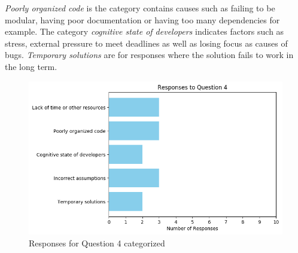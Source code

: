 \documentclass[../main.tex]{subfiles}
\begin{document}
\textit{Poorly organized code} is the category contains causes such as failing to be modular, having poor documentation or having too many dependencies for example. The category \textit{cognitive state of developers} indicates factors such as stress, external pressure to meet deadlines as well as losing focus as causes of bugs. \textit{Temporary solutions} are for responses where the solution fails to work in the long term. 

\begin{figure}[H]
    \centering
    \includegraphics[scale=0.7]{images/Results/RQ2/RQ2_question_4.png}
    \caption{Responses for Question 4 categorized}
    \label{fig:rq4Image4}
\end{figure}
\end{document}
